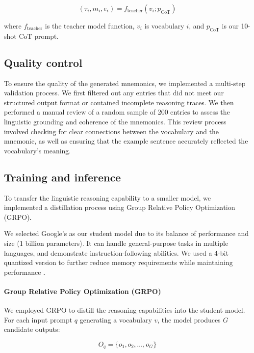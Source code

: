 \begin{equation}
(\tau_i, m_i, e_i) = f_{\text{teacher}}(v_i; p_{\text{CoT}})
\end{equation}

where $f_{\text{teacher}}$ is the teacher model function, $v_i$ is vocabulary $i$, and $p_{\text{CoT}}$ is our 10-shot CoT prompt.

\subsection{Quality control} To ensure the quality of the generated mnemonics, we implemented a multi-step validation process. We first filtered out any entries that did not meet our structured output format or contained incomplete reasoning traces. We then performed a manual review of a random sample of 200 entries to assess the linguistic grounding and coherence of the mnemonics. This review process involved checking for clear connections between the vocabulary and the mnemonic, as well as ensuring that the example sentence accurately reflected the vocabulary's meaning.

\subsection{Training and inference} \label{sec:training-inference}
To transfer the linguistic reasoning capability to a smaller model, we implemented a distillation process using Group Relative Policy Optimization (GRPO).

We selected Google's \studentmodel \citep{GemmaTeamGEMMA2025} as our student model due to its balance of performance and size (1 billion parameters). It can handle general-purpose tasks in multiple languages, and demonstrate instruction-following abilities. We used a 4-bit quantized version to further reduce memory requirements while maintaining performance \citep{dettmersQLoRAEfficientFinetuning2023}.

\paragraph*{Group Relative Policy Optimization (GRPO)} We employed GRPO \citep{DeepSeek-AIDEEPSEEKR12025} to distill the reasoning capabilities into the student model. For each input prompt $q$ generating a vocabulary $v$, the model produces $G$ candidate outputs:

\begin{equation}
O_q = \{o_1, o_2, \ldots, o_G\}
\end{equation}

